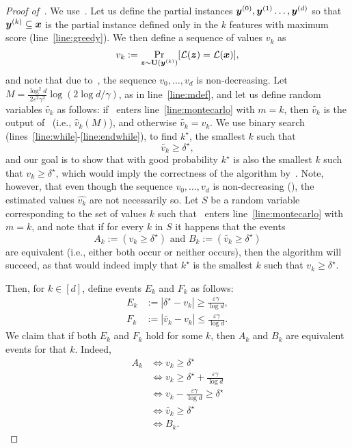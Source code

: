 	

\begin{proof}[Proof of~]
We use~. Let us define the partial instances ${\bm{y}}^{(0)}, {\bm{y}}^{(1)} \ldots, {\bm{y}}^{(d)}$ so that ${\bm{y}}^{(k)} \subseteq {\bm{x}}$ is the partial instance defined only in the $k$ features with maximum score (line~\ref{line:greedy}). %
We then define a sequence of values
  $v_k$ as
	\[
		v_k := \Pr_{{\bm{z}} \sim \mathbf{U}({\bm{y}}^{(k)})}[\mathcal{L}({\bm{z}}) = \mathcal{L}({\bm{x}})],
	\]
	and note that due to~, the sequence $v_0, \ldots, v_d$ is non-decreasing.
Let $M = \frac{\log^2{d}}{2\varepsilon^2 \gamma^2} \log(2 \log d / \gamma)$, as in line~\ref{line:mdef}, and let us define random variables $\widetilde{v_k}$ as follows: if~ enters line~\ref{line:montecarlo} with $m=k$, then $\widetilde{v_k}$ is the output of~ (i.e., $\widehat{v}_k(M)$), and otherwise $\widetilde{v_k} = v_k$.  
We use binary search (lines~\ref{line:while}-\ref{line:endwhile}), to find $k^\star$, the smallest $k$ such that
\[
	\widetilde{v_k} \geq \delta^\star,
\]
and our goal is to show that with good probability $k^\star$ is also the smallest $k$ such that $v_k \geq \delta^\star$, which would imply the correctness of the algorithm by~.
Note, however, that even though the sequence $v_0, \ldots, v_d$ is non-decreasing (), the estimated values $\widehat{v_k}$ are not necessarily so.
Let $S$ be a random variable corresponding to the set of values $k$ such that~ enters line~\ref{line:montecarlo} with $m=k$, and note that if for every $k$ in $S$ it happens that the events 
\[
	A_k := \left(v_k \geq \delta^\star \right) \text{ and }  B_k := \left(\widetilde{v_k} \geq \delta^\star\right)
\]
are equivalent (i.e., either both occur or neither occurs), then the algorithm will succeed, as that would indeed imply that $k^\star$ is the smallest $k$ such that $v_k \geq \delta^\star$. 

Then, for $k \in [d]$, define events $E_k$ and $F_k$ as follows:
\begin{align*}
	E_k &:= |\delta^\star - v_k| \geq \frac{\varepsilon \gamma}{\log d},\\
	F_k &:= |\widetilde{v_k} - v_k| \leq \frac{\varepsilon \gamma}{\log d}.
\end{align*}
We claim that if both $E_k$ and $F_k$ hold for some $k$, then $A_k$ and $B_k$ are equivalent events for that $k$. Indeed,
\begin{align*}
	A_k &\iff v_k \geq \delta^\star\\
		&\iff v_k \geq \delta^\star + \frac{\varepsilon \gamma}{\log d} \tag{by $E_k$}\\
		&\iff v_k - \frac{\varepsilon \gamma}{\log d} \geq \delta^\star\\
		&\iff \widetilde{v_k} \geq \delta^\star \tag{by $F_k$}\\
		&\iff B_k.
\end{align*}


\end{proof}
